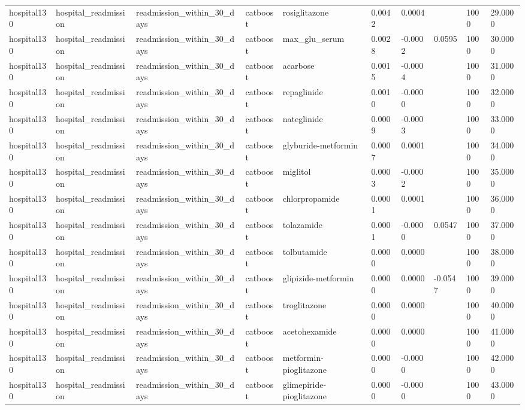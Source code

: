 \begin{tabular}{llllllllll}
hospital130 & hospital\_readmission & readmission\_within\_30\_days & catboost & rosiglitazone & 0.0042 & 0.0004 &  & 1000 & 29.0000 \\
hospital130 & hospital\_readmission & readmission\_within\_30\_days & catboost & max\_glu\_serum & 0.0028 & -0.0002 & 0.0595 & 1000 & 30.0000 \\
hospital130 & hospital\_readmission & readmission\_within\_30\_days & catboost & acarbose & 0.0015 & -0.0004 &  & 1000 & 31.0000 \\
hospital130 & hospital\_readmission & readmission\_within\_30\_days & catboost & repaglinide & 0.0010 & -0.0000 &  & 1000 & 32.0000 \\
hospital130 & hospital\_readmission & readmission\_within\_30\_days & catboost & nateglinide & 0.0009 & -0.0003 &  & 1000 & 33.0000 \\
hospital130 & hospital\_readmission & readmission\_within\_30\_days & catboost & glyburide-metformin & 0.0007 & 0.0001 &  & 1000 & 34.0000 \\
hospital130 & hospital\_readmission & readmission\_within\_30\_days & catboost & miglitol & 0.0003 & -0.0002 &  & 1000 & 35.0000 \\
hospital130 & hospital\_readmission & readmission\_within\_30\_days & catboost & chlorpropamide & 0.0001 & 0.0001 &  & 1000 & 36.0000 \\
hospital130 & hospital\_readmission & readmission\_within\_30\_days & catboost & tolazamide & 0.0001 & -0.0000 & 0.0547 & 1000 & 37.0000 \\
hospital130 & hospital\_readmission & readmission\_within\_30\_days & catboost & tolbutamide & 0.0000 & 0.0000 &  & 1000 & 38.0000 \\
hospital130 & hospital\_readmission & readmission\_within\_30\_days & catboost & glipizide-metformin & 0.0000 & 0.0000 & -0.0547 & 1000 & 39.0000 \\
hospital130 & hospital\_readmission & readmission\_within\_30\_days & catboost & troglitazone & 0.0000 & 0.0000 &  & 1000 & 40.0000 \\
hospital130 & hospital\_readmission & readmission\_within\_30\_days & catboost & acetohexamide & 0.0000 & 0.0000 &  & 1000 & 41.0000 \\
hospital130 & hospital\_readmission & readmission\_within\_30\_days & catboost & metformin-pioglitazone & 0.0000 & -0.0000 &  & 1000 & 42.0000 \\
hospital130 & hospital\_readmission & readmission\_within\_30\_days & catboost & glimepiride-pioglitazone & 0.0000 & -0.0000 &  & 1000 & 43.0000 \\

\end{tabular}
